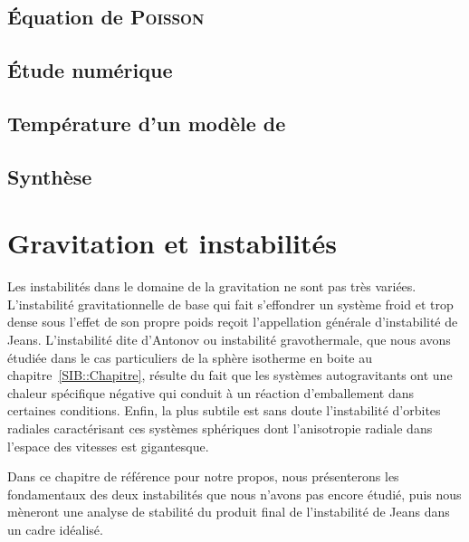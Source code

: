 	\section{Équation de \textsc{Poisson}}
		

	\section{Étude numérique}
		


	\section{Température d'un modèle de \King \label{sec::temp}}
		

	\section{Synthèse}
		


\chapter{Gravitation et instabilités}\label{Chap::Instabilite}
	\minitoc

	Les instabilités dans le domaine de la gravitation ne sont pas très variées. L'instabilité gravitationnelle de base qui fait s'effondrer un
	système froid et trop dense sous l'effet de son propre poids reçoit l'appellation générale d'instabilité de Jeans. L'instabilité dite
	d'Antonov ou instabilité gravothermale, que nous avons étudiée dans le cas particuliers de la sphère isotherme en boite au
	chapitre~\ref{SIB::Chapitre}, résulte du fait que les systèmes autogravitants ont une chaleur spécifique négative qui conduit à un réaction
	d'emballement dans certaines conditions. Enfin, la plus subtile est sans doute l'instabilité d'orbites radiales caractérisant ces systèmes
	sphériques dont l'anisotropie radiale dans l'espace des vitesses est gigantesque.

	Dans ce chapitre de référence pour notre propos, nous présenterons les fondamentaux des deux instabilités que nous n'avons pas encore étudié,
	puis nous mèneront une analyse de stabilité du produit final de l'instabilité de Jeans dans un cadre idéalisé.

